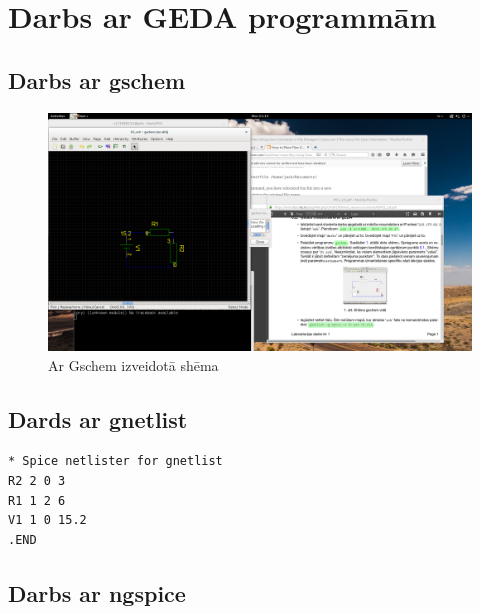 \documentclass{report}
\begin{document}
\section{Darbs ar GEDA programmām}
\subsection{Darbs ar gschem}

\begin{figure}[!b]
\includegraphics[width=14cm]{bildes/01.png}
\caption{Ar Gschem izveidotā shēma}
\label{1}
\end{figure}
\newpage
\subsection{Dards ar gnetlist}
\begin{verbatim}
* Spice netlister for gnetlist
R2 2 0 3
R1 1 2 6
V1 1 0 15.2
.END
\end{verbatim}

\subsection{Darbs ar ngspice}
\end{document}

